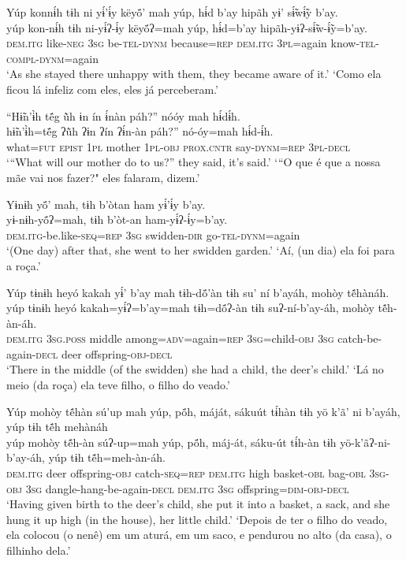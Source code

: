 \documentclass[output=paper,
modfonts,nonflat
]{langsci/langscibook}
\begin{document}
\ea  Yúp konnɨ́h tɨh ni yɨ́’ɨ́y këyö́’ mah yúp, hɨ́d b’ay hipãh yɨ’ sɨ̃́wɨ̃́y b’ay.\\
\gll yúp kon-nɨ́h tɨh ni-yɨ́ʔ-ɨ́y këyö́ʔ=mah yúp, hɨ́d=b’ay hipãh-yɨʔ-sɨ̃́w-ɨ̃́y=b’ay.\\
     \textsc{dem.itg} like\textsc{-neg} \textsc{3sg} be\textsc{-tel-dynm} because\textsc{=rep} \textsc{dem.itg} \textsc{3pl}=again know\textsc{-tel-compl-dynm}=again\\
\glt ‘As she stayed there unhappy with them, they became aware of it.'
\glt ‘Como ela ficou lá infeliz com eles, eles já perceberam.'
\z 

\ea  “Hɨ̃n’ɨ̀h të́g ũ̀h ɨn ín ɨ́nàn páh?” nóóy mah hɨ́dɨ́h.\\
\gll hɨ̃n’ɨ̀h=të́g ʔũ̀h ʔɨn ʔín ʔɨ́n-àn páh?” nó-óy=mah hɨ́d-ɨ́h.\\
     what\textsc{=fut} \textsc{epist} \textsc{1pl} mother \textsc{1pl-obj} \textsc{prox.cntr} say\textsc{-dynm=rep} \textsc{3pl-decl}\\
\glt ‘“What will our mother do to us?” they said, it’s said.'
\glt ‘“O que é que a nossa mãe vai nos fazer?" eles falaram, dizem.'
\z 

\ea  Yɨnɨh yö́’ mah, tɨh b’òtan ham yɨ́’ɨ́y b’ay.\\
\gll yɨ-nɨh-yö́ʔ=mah, tɨh b’òt-an ham-yɨ́ʔ-ɨ́y=b’ay.\\
     \textsc{dem.itg-}be.like\textsc{-seq=rep} \textsc{3sg} swidden\textsc{-dir} go\textsc{-tel-dynm}=again\\
\glt ‘(One day) after that, she went to her swidden garden.'
\glt ‘Aí, (un dia) ela foi para a roça.'
\z 

\ea  Yúp tɨnɨh heyó kakah yɨ́’ b'ay mah tɨh-dö́’àn tɨh su’ ní b’ayáh, mohòy tẽ́hànáh.\\
\gll yúp tɨnɨh heyó kakah=yɨ́ʔ=b'ay=mah tɨh=dö́ʔ-àn tɨh suʔ-ní-b’ay-áh, mohòy tẽ́h-àn-áh.\\
     \textsc{dem.itg} \textsc{3sg.poss} middle among\textsc{=adv}=again\textsc{=rep} \textsc{3sg=}child\textsc{-obj} \textsc{3sg} catch-be-again\textsc{-decl} deer offspring\textsc{-obj-decl}\\
\glt ‘There in the middle (of the swidden) she had a child, the deer’s child.'
\glt ‘Lá no meio (da roça) ela teve filho, o filho do veado.'
\z 

\ea  Yúp mohòy tẽ́hàn sú’up mah yúp, pö́h, máját, sákuút tɨ́hàn tɨh yö k’ã’ ni b’ayáh, yúp tɨh tẽ́h mehànáh\\
\gll yúp mohòy tẽ́h-àn súʔ-up=mah yúp, pö́h, máj-át, sáku-út tɨ́h-àn tɨh yö-k’ãʔ-ni-b’ay-áh, yúp tɨh tẽ́h=meh-àn-áh.\\
     \textsc{dem.itg} deer offspring\textsc{-obj} catch\textsc{-seq=rep} \textsc{dem.itg} high basket\textsc{-obl} bag\textsc{-obl} \textsc{3sg-obj} \textsc{3sg} dangle-hang-be-again\textsc{-decl} \textsc{dem.itg} \textsc{3sg} offspring\textsc{=dim-obj-decl}\\
\glt ‘Having given birth to the deer’s child, she put it into a basket, a sack, and she hung it up high (in the house), her little child.'
\glt ‘Depois de ter o filho do veado, ela colocou (o nenê) em um aturá, em um saco, e pendurou no alto (da casa), o filhinho dela.'
\z 
\end{document}
